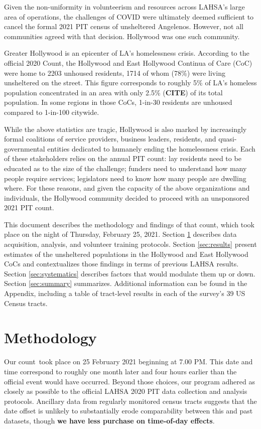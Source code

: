 \documentclass[11pt,twocolumn]{article}
\def\bfr{\bf\color{red}}
\def\Count{count}
\begin{document}
Given the non-uniformity in volunteerism and resources across LAHSA's large area of operations, 
the challenges of COVID were ultimately deemed sufficient to cancel the formal 2021 PIT census of 
unsheltered Angelenos. However, not all communities agreed with that decision. Hollywood was one 
such community.

Greater Hollywood is an epicenter of LA's homelessness crisis. According to the official 2020 
Count, the Hollywood and East Hollywood Continua of Care (CoC) were home to 2203 unhoused residents,
1714 of whom (78\%) were living unsheltered on the street. This figure corresponds to roughly 5\% of LA's 
homeless population concentrated in an area with only 2.5\% ({\bfr CITE}) of its total population. In some 
regions in those CoCs, 1-in-30 residents are unhoused compared to 1-in-100 citywide.

While the above statistics are tragic, Hollywood is also marked by increasingly formal coalitions of 
service providers, business leaders, residents, and quasi-governmental entities dedicated to humanely 
ending the homelessness crisis. Each of these stakeholders relies on the annual PIT count: lay residents need
to be educated as to the size of the challenge; funders need to understand how many people require services;
legislators need to know how many people are dwelling where. For these reasons, and given the 
capacity of the above organizations and individuals, the Hollywood community decided to proceed with 
an unsponsored 2021 PIT \Count.

This document describes the methodology and findings of that \Count, which took place on the night of 
Thursday, February 25, 2021. Section \ref{sec:procedure} describes data acquisition, analysis, and volunteer
training protocols. Section \ref{sec:results} present estimates of the unsheltered 
populations in the Hollywood and East Hollywood CoCs and contextualizes those findings in terms of 
previous LAHSA results. Section \ref{sec:systematics} describes factors that would
modulate them up or down. Section \ref{sec:summary} summarizes. Additional information
can be found in the Appendix, including a table of tract-level results in each of the survey's 39 US 
Census tracts.

\section{Methodology}
\label{sec:procedure}

Our \Count\ took place on 25 February 2021 beginning at 7.00 PM. This date and time correspond to 
roughly one month later and four hours earlier than the official event would have occurred. Beyond
those choices, our program adhered as closely as possible to the official LAHSA 2020 PIT data 
collection and analysis protocols. Ancillary data from regularly monitored census tracts suggests 
that the date offset is unlikely to substantially erode comparability between this and past datasets, 
though {\bfr we have less purchase on time-of-day effects}.
\end{document}
